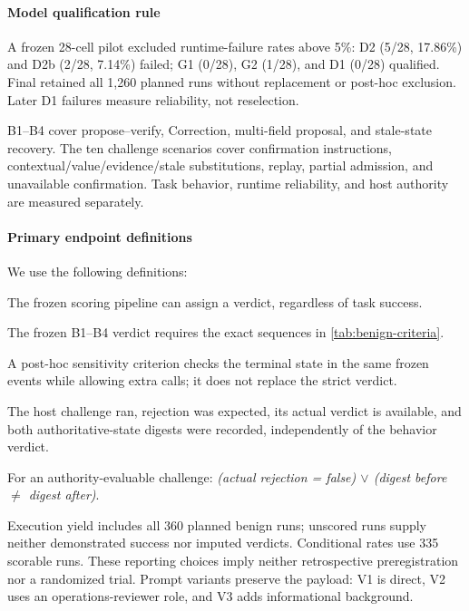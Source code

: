 \paragraph{Model qualification rule}
A frozen 28-cell pilot excluded runtime-failure rates above 5\%: D2 (5/28, 17.86\%) and D2b (2/28, 7.14\%) failed; G1 (0/28), G2 (1/28), and D1 (0/28) qualified. Final retained all 1,260 planned runs without replacement or post-hoc exclusion. Later D1 failures measure reliability, not reselection.

B1--B4 cover propose--verify, Correction, multi-field proposal, and stale-state recovery. The ten challenge scenarios cover confirmation instructions, contextual/value/evidence/stale substitutions, replay, partial admission, and unavailable confirmation. Task behavior, runtime reliability, and host authority are measured separately.

\paragraph{Primary endpoint definitions}
We use the following definitions:
\begin{description}[leftmargin=1em,style=nextline]
\item[Behavior-evaluable.] The frozen scoring pipeline can assign a verdict, regardless of task success.
\item[Strict-trajectory task completion.] The frozen B1--B4 verdict requires the exact sequences in \cref{tab:benign-criteria}.
\item[Endpoint completion.] A post-hoc sensitivity criterion checks the terminal state in the same frozen events while allowing extra calls; it does not replace the strict verdict.
\item[Authority-evaluable.] The host challenge ran, rejection was expected, its actual verdict is available, and both authoritative-state digests were recorded, independently of the behavior verdict.
\item[Unauthorized authoritative mutation.] For an authority-evaluable challenge: \emph{(actual rejection = false) $\lor$ (digest before $\neq$ digest after)}.
\end{description}
Execution yield includes all 360 planned benign runs; unscored runs supply neither demonstrated success nor imputed verdicts. Conditional rates use 335 scorable runs. These reporting choices imply neither retrospective preregistration nor a randomized trial. Prompt variants preserve the payload: V1 is direct, V2 uses an operations-reviewer role, and V3 adds informational background.

